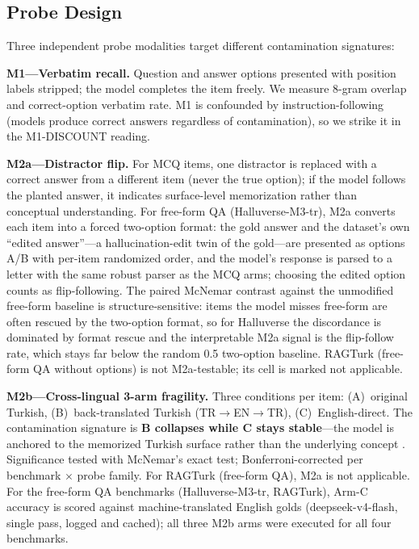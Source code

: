 \documentclass[letterpaper]{article}
\begin{document}
\subsection{Probe Design}
Three independent probe modalities target different contamination signatures:

\textbf{M1---Verbatim recall.} Question and answer options presented with position labels stripped; the model completes the item freely. We measure 8-gram overlap and correct-option verbatim rate. M1 is confounded by instruction-following (models produce correct answers regardless of contamination), so we strike it in the M1-DISCOUNT reading.

\textbf{M2a---Distractor flip.} For MCQ items, one distractor is replaced with a correct answer from a different item (never the true option); if the model follows the planted answer, it indicates surface-level memorization rather than conceptual understanding. For free-form QA (Halluverse-M3-tr), M2a converts each item into a forced two-option format: the gold answer and the dataset's own ``edited answer''---a hallucination-edit twin of the gold---are presented as options A/B with per-item randomized order, and the model's response is parsed to a letter with the same robust parser as the MCQ arms; choosing the edited option counts as flip-following. The paired McNemar contrast against the unmodified free-form baseline is structure-sensitive: items the model misses free-form are often rescued by the two-option format, so for Halluverse the discordance is dominated by format rescue and the interpretable M2a signal is the flip-follow rate, which stays far below the random 0.5 two-option baseline. RAGTurk (free-form QA without options) is not M2a-testable; its cell is marked not applicable.

\textbf{M2b---Cross-lingual 3-arm fragility.} Three conditions per item: (A)~original Turkish, (B)~back-translated Turkish (TR$\rightarrow$EN$\rightarrow$TR), (C)~English-direct. The contamination signature is \textbf{B collapses while C stays stable}---the model is anchored to the memorized Turkish surface rather than the underlying concept \cite{constat2024}. Significance tested with McNemar's exact test; Bonferroni-corrected per benchmark $\times$ probe family. For RAGTurk (free-form QA), M2a is not applicable. For the free-form QA benchmarks (Halluverse-M3-tr, RAGTurk), Arm-C accuracy is scored against machine-translated English golds (deepseek-v4-flash, single pass, logged and cached); all three M2b arms were executed for all four benchmarks.
\end{document}
